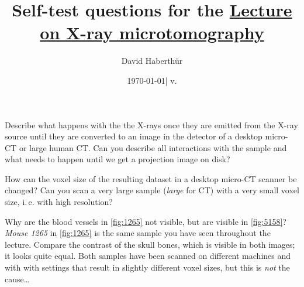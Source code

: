 \documentclass[a4paper]{exam}
\title{Self-test questions for the \href{https://ilias.unibe.ch/goto_ilias3_unibe_sess_2466944.html}{Lecture on X-ray microtomography}}
\author{David Haberthür}
\date{\today\xspace| v. \gitAbbrevHash}
\newcommand{\uct}{{\textmu}CT\xspace}%
\newcommand{\ie}{i.\,e.\xspace}%
\begin{document}
\maketitle

\begin{questions}

\question Describe what happens with the the X-rays once they are emitted from the X-ray source until they are converted to an image in the detector of a desktop micro-CT or large human CT.
	Can you describe all interactions with the sample and what needs to happen until we get a projection image on disk?

\question How can the voxel size of the resulting dataset in a desktop micro-CT scanner be changed?
	Can you scan a very large sample (\emph{large} for \uct) with a very small voxel size, \ie with high resolution?

\question Why are the blood vessels in \autoref{fig:1265} not visible, but are visible in \autoref{fig:5158}?
	\emph{Mouse 1265} in \autoref{fig:1265} is the same sample you have seen throughout the lecture.
	Compare the contrast of the skull bones, which is visible in both images; it looks quite equal.
	Both samples have been scanned on different machines and with with settings that result in slightly different voxel sizes, but this is \emph{not} the cause\ldots


\end{questions}
\end{document}
